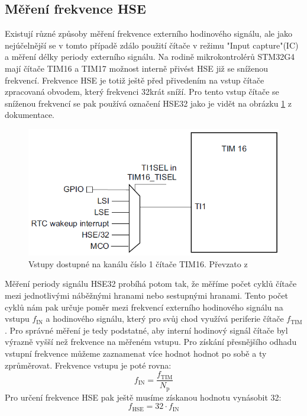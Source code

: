 \subsection{Měření frekvence HSE}
Existují různé způsoby měření frekvence externího hodinového signálu, ale jako nejúčelnější se v tomto případě zdálo použití čítače v režimu "Input capture"(IC) a měření délky periody externího signálu. Na rodině mikrokontrolérů STM32G4 mají čítače TIM16 a TIM17 možnost interně přivést HSE již se sníženou frekvencí. Frekvence HSE je totiž ještě před přivedením na vstup čítače zpracovaná obvodem, který frekvenci 32krát sníží. Pro tento vstup čítače se sníženou frekvencí se pak používá označení HSE32 jako je vidět na obrázku \ref{fig:tim16inputs} z dokumentace.

\begin{figure}[H]
	\centering
	\includegraphics[width=0.7\linewidth]{Figs/Documentation/TIM16_Inputs}
	\caption[Vstupy čítače TIM16]{Vstupy dostupné na kanálu číslo 1 čítače TIM16. Převzato z\cite{refG4}}
	\label{fig:tim16inputs}
\end{figure}

Měření periody signálu HSE32 probíhá potom tak, že měříme počet cyklů čítače mezi jednotlivými náběžnými hranami nebo sestupnými hranami. Tento počet cyklů nám pak určuje poměr mezi frekvencí externího hodinového signálu na vstupu $	f_{\text{IN}}$ a hodinového signálu, který pro svůj chod využívá periferie čítače $	f_{\text{TIM}}$. Pro správné měření je tedy podstatné, aby interní hodinový signál čítače byl výrazně vyšší než frekvence na měřeném vstupu. Pro získání přesnějšího odhadu vstupní frekvence můžeme zaznamenat více hodnot hodnot po sobě a ty  zprůměrovat. Frekvence vstupu je poté rovna:
\begin{equation}
	f_{\text{IN}}=\frac{f_{\text{TIM}}}{N_\text{p}}
\end{equation}
Pro určení frekvence HSE pak ještě musíme získanou hodnotu vynásobit 32:
\begin{equation}
	f_{\text{HSE}}=32 \cdot f_{\text{IN}}
\end{equation}
